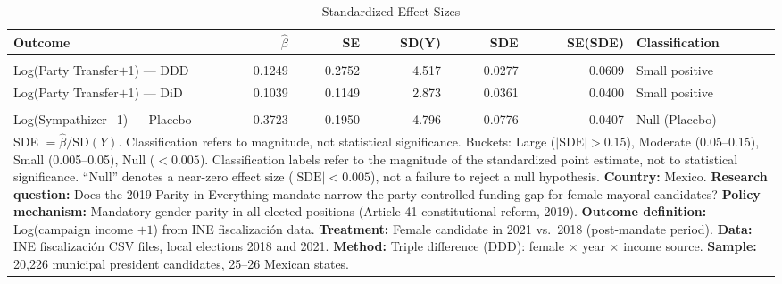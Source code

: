 \begin{table}[!h]
\centering
\caption{\label{tab:tabF1_sde}Standardized Effect Sizes}
\centering
\begin{adjustbox}{max width=\textwidth}
\begin{tabular}[t]{lrrrrrl}
\toprule
Outcome & $\hat{\beta}$ & SE & SD(Y) & SDE & SE(SDE) & Classification\\
\midrule
\addlinespace[0.3em]
\multicolumn{7}{l}{\textbf{Panel A: Main Estimates (Pooled)}}\\
\hspace{1em}Log(Party Transfer$+$1) --- DDD & 0.1249 & 0.2752 & 4.517 & 0.0277 & 0.0609 & Small positive\\
\hspace{1em}Log(Party Transfer$+$1) --- DiD & 0.1039 & 0.1149 & 2.873 & 0.0361 & 0.0400 & Small positive\\
\addlinespace[0.3em]
\multicolumn{7}{l}{\textbf{Panel B: Placebo Test}}\\
\hspace{1em}Log(Sympathizer$+$1) --- Placebo & $-$0.3723 & 0.1950 & 4.796 & $-$0.0776 & 0.0407 & Null (Placebo)\\
\bottomrule
\multicolumn{7}{p{0.95\textwidth}}{\rule{0pt}{1em}\small
SDE $= \hat{\beta} / \text{SD}(Y)$. Classification refers to magnitude, not statistical significance.
Buckets: Large ($|\text{SDE}| > 0.15$), Moderate (0.05--0.15), Small (0.005--0.05), Null ($< 0.005$).
Classification labels refer to the magnitude of the standardized point estimate, not to statistical significance.
``Null'' denotes a near-zero effect size ($|\text{SDE}| < 0.005$), not a failure to reject a null hypothesis.
\textbf{Country:} Mexico.
\textbf{Research question:} Does the 2019 Parity in Everything mandate narrow the party-controlled funding gap for female mayoral candidates?
\textbf{Policy mechanism:} Mandatory gender parity in all elected positions (Article 41 constitutional reform, 2019).
\textbf{Outcome definition:} Log(campaign income $+ 1$) from INE fiscalizaci\'{o}n data.
\textbf{Treatment:} Female candidate in 2021 vs.\ 2018 (post-mandate period).
\textbf{Data:} INE fiscalizaci\'{o}n CSV files, local elections 2018 and 2021.
\textbf{Method:} Triple difference (DDD): female $\times$ year $\times$ income source.
\textbf{Sample:} 20,226 municipal president candidates, 25--26 Mexican states.
}\\
\end{tabular}
\end{adjustbox}
\end{table}
